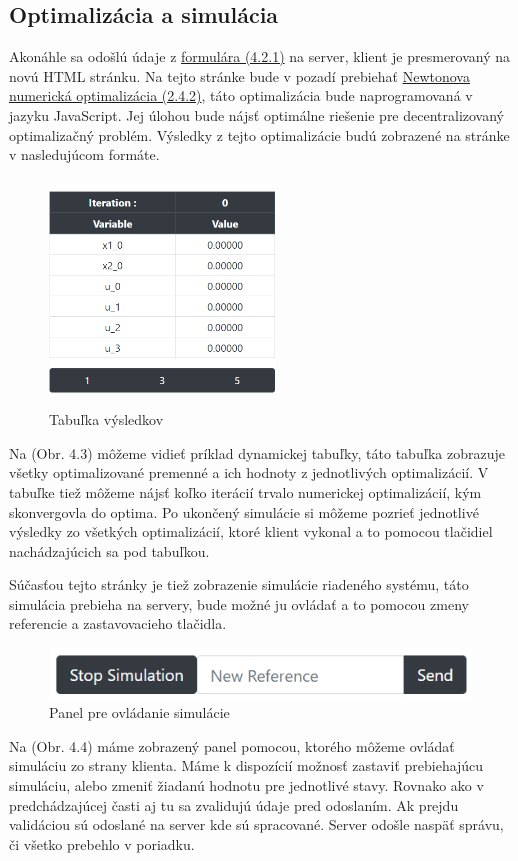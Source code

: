 \subsection{Optimalizácia a simulácia}
\label{subse:OPTaSIM}
Akonáhle sa odošlú údaje z \hyperref[subse:Formular]{formulára (4.2.1)} na server, klient je presmerovaný na novú HTML stránku. Na tejto stránke bude v pozadí prebiehať \hyperref[opt:Newton]{Newtonova numerická optimalizácia (2.4.2)}, táto optimalizácia bude naprogramovaná v jazyku JavaScript. Jej úlohou bude nájsť optimálne riešenie pre decentralizovaný optimalizačný problém. Výsledky z tejto optimalizácie budú zobrazené na stránke v nasledujúcom formáte. 
\label{fig:Tabulka}
\begin{figure}[H]	
	\centering
	\includegraphics[width=6cm,height=6cm]{images/tabulka}
	\caption{Tabuľka výsledkov}
\end{figure}
Na (Obr. 4.3) môžeme vidieť príklad dynamickej tabuľky, táto tabuľka zobrazuje všetky optimalizované premenné a ich hodnoty z jednotlivých optimalizácií. V tabuľke tiež môžeme nájsť koľko iterácií trvalo numerickej optimalizácií, kým skonvergovla do optima. Po ukončený simulácie si môžeme pozrieť jednotlivé výsledky zo všetkých optimalizácií, ktoré klient vykonal a to pomocou tlačidiel nachádzajúcich sa pod tabuľkou.

Súčasťou tejto stránky je tiež zobrazenie simulácie riadeného systému, táto simulácia prebieha na servery, bude možné ju ovládať a to pomocou zmeny referencie a zastavovacieho tlačidla.
\begin{figure}[H]	
	\centering
	\includegraphics{images/ovladanie_simulacie}
	\caption{Panel pre ovládanie simulácie}
\end{figure}
Na (Obr. 4.4) máme zobrazený panel pomocou, ktorého môžeme ovládať simuláciu zo strany klienta. Máme k dispozícií možnosť zastaviť prebiehajúcu simuláciu, alebo zmeniť žiadanú hodnotu pre jednotlivé stavy. Rovnako ako v predchádzajúcej časti aj tu sa zvalidujú údaje pred odoslaním. Ak prejdu validáciou sú odoslané na server kde sú spracované. Server odošle naspäť správu, či všetko prebehlo v poriadku.

